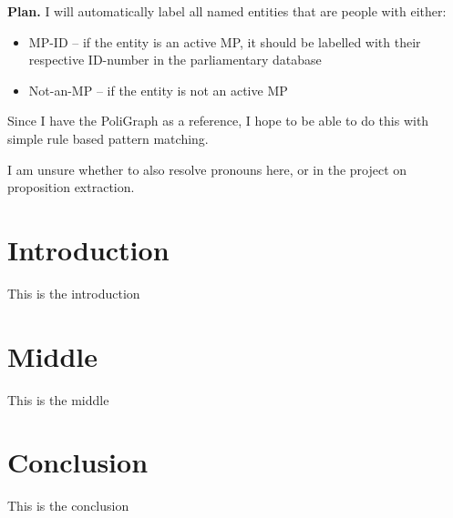 \UseRawInputEncoding


\textbf{Plan.} I will automatically label all named entities that are people with either:

\begin{itemize}
    \item MP-ID -- if the entity is an active MP, it should be labelled with their respective ID-number in the parliamentary database
    \item Not-an-MP -- if the entity is not an active MP
\end{itemize}

Since I have the PoliGraph as a reference, I hope to be able to do this with simple rule based pattern matching.

I am unsure whether to also resolve pronouns here, or in the project on proposition extraction.

\section{Introduction}

This is the introduction

\section{Middle}

This is the middle

\section{Conclusion}

This is the conclusion